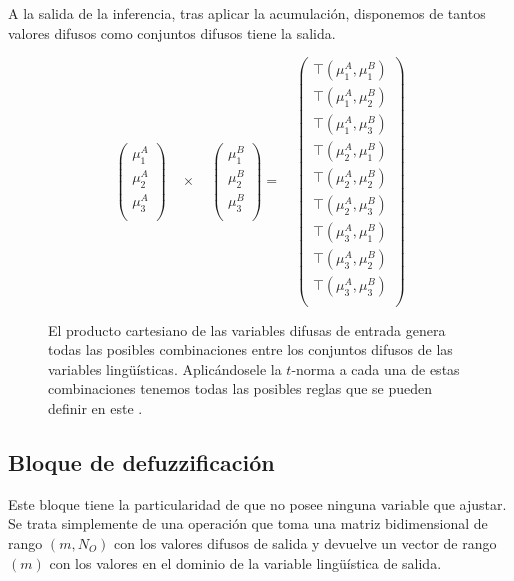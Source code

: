 A la salida de la inferencia, tras aplicar la acumulación, disponemos de tantos valores difusos como conjuntos difusos tiene la salida.

\begin{figure}[t]
	\centering
	\begin{equation*}
		\left(\begin{array}{c}
			\mu_1^A \\
			\mu_2^A \\
			\mu_3^A \\
		\end{array}\right)
		\quad \times \quad
		\left(\begin{array}{ c}
			\mu_1^B \\
			\mu_2^B \\
			\mu_3^B \\
		\end{array}\right)
		= \quad 
		\left(\begin{array}{c}
			\top(\mu_1^A, \mu_1^B) \\
			\top(\mu_1^A, \mu_2^B) \\
			\top(\mu_1^A, \mu_3^B) \\
			\top(\mu_2^A, \mu_1^B) \\
			\top(\mu_2^A, \mu_2^B) \\
			\top(\mu_2^A, \mu_3^B) \\
			\top(\mu_3^A, \mu_1^B) \\
			\top(\mu_3^A, \mu_2^B) \\
			\top(\mu_3^A, \mu_3^B) \\
		\end{array}\right)
	\end{equation*}
	\caption[Producto cartesiano de variables difusas de entrada]{El producto cartesiano de las variables difusas de entrada genera todas las posibles combinaciones entre los conjuntos difusos de las variables lingüísticas. Aplicándosele la $t$-norma a cada una de estas combinaciones tenemos todas las posibles reglas que se pueden definir en este .}
	\label{fig:inference-graph}
\end{figure}

\subsection{Bloque de defuzzificación}

Este bloque tiene la particularidad de que no posee ninguna variable que ajustar. Se trata simplemente de una operación que toma una matriz bidimensional de rango $(m, N_O)$ con los valores difusos de salida y devuelve un vector de rango $(m)$ con los valores en el dominio de la variable lingüística de salida.


